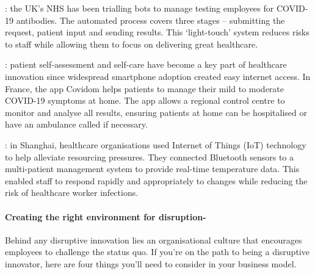 \documentclass[a4paper,12pt]{extarticle}
\begin{document}
\begin{description}[font=$\bullet$~\normalfont\scshape\color{red!50!black}]

\item[Automation in COVID-19 antibody testing]: the UK’s NHS has been trialling bots to manage testing employees for COVID-19 antibodies. The automated process covers three stages – submitting the request, patient input and sending results. This ‘light-touch’ system reduces risks to staff while allowing them to focus on delivering great healthcare. 

\item[Home monitoring applications]: patient self-assessment and self-care have become a key part of healthcare innovation since widespread smartphone adoption created easy internet access. In France, the app Covidom helps patients to manage their mild to moderate COVID-19 symptoms at home. The app allows a regional control centre to monitor and analyse all results, ensuring patients at home can be hospitalised or have an ambulance called if necessary. 

\item[Wearable technology]: in Shanghai, healthcare organisations used Internet of Things (IoT) technology to help alleviate resourcing pressures. They connected Bluetooth sensors to a multi-patient management system to provide real-time temperature data. This enabled staff to respond rapidly and appropriately to changes while reducing the risk of healthcare worker infections.

\end{description}

\paragraph{Creating the right environment for disruption-} Behind any disruptive innovation lies an organisational culture that encourages employees to challenge the status quo. If you’re on the path to being a disruptive innovator, here are four things you’ll need to consider in your business model.\\
\end{document}
